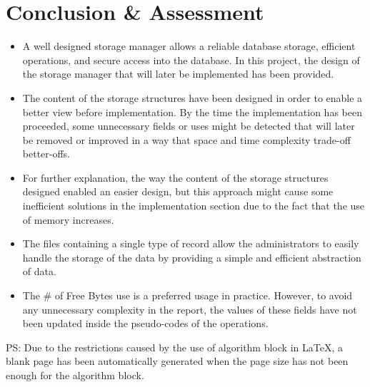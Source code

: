 \documentclass[12pt]{article}
\begin{document}
\section{\large Conclusion \& Assessment}
\begin{itemize}
    \item A well designed storage manager allows a reliable database storage, efficient operations, and secure access into the database. In this project, the design of the storage manager that will later be implemented has been provided.
    \item The content of the storage structures have been designed in order to enable a better view before implementation. By the time the implementation has been proceeded, some unnecessary fields or uses might be detected that will later be removed or improved in a way that space and time complexity trade-off better-offs.
    \item For further explanation, the way the content of the storage structures designed enabled an easier design, but this approach might cause some inefficient solutions in the implementation section due to the fact that the use of memory increases.
    \item The files containing a single type of record allow the administrators to easily handle the storage of the data by providing a simple and efficient abstraction of data.
    \item The \# of Free Bytes use is a preferred usage in practice. However, to avoid any unnecessary complexity in the report, the values of these fields have not been updated inside the pseudo-codes of the operations.
\end{itemize}

PS: Due to the restrictions caused by the use of algorithm block in LaTeX, a blank page has been automatically generated when the page size has not been enough for the algorithm block.
\end{document}
